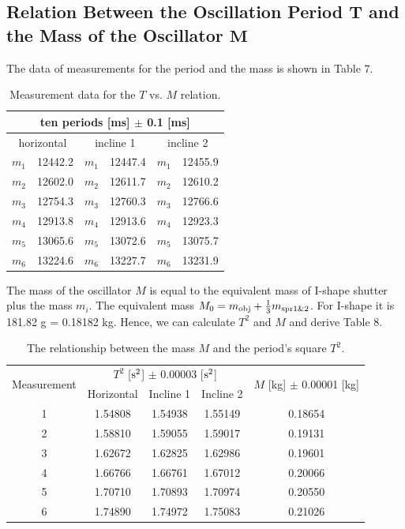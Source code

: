 \documentclass[a4paper]{report}
\begin{document}
	\subsection{Relation Between the Oscillation Period $\bm{T}$ and the Mass of the Oscillator $\bm{M}$}
	The data of measurements for the period and the mass is shown in Table 7.
	\begin{table}[H]
		\centering
		\begin{tabular}{|c|c||c|c||c|c|}
			\hline
			\multicolumn{6}{|c|}{ten periods [ms] $\pm$ 0.1 [ms]}\\
			\hline
			\multicolumn{2}{|c||}{horizontal}&\multicolumn{2}{|c||}{incline 1}&\multicolumn{2}{|c|}{incline 2}\\
			\hline
			$m_1$&12442.2&$m_1$&12447.4&$m_1$&12455.9\\
			\hline
			$m_2$&12602.0&$m_2$&12611.7&$m_2$&12610.2\\
			\hline
			$m_3$&12754.3&$m_3$&12760.3&$m_3$&12766.6\\
			\hline
			$m_4$&12913.8&$m_4$&12913.6&$m_4$&12923.3\\
			\hline
			$m_5$&13065.6&$m_5$&13072.6&$m_5$&13075.7\\
			\hline
			$m_6$&13224.6&$m_6$&13227.7&$m_6$&13231.9\\
			\hline
		\end{tabular}
	\caption{Measurement data for the $T$ vs. $M$ relation.}
	\end{table}
	The mass of the oscillator $M$ is equal to the equivalent mass of I-shape shutter plus the mass $m_i$. The equivalent mass $M_0=m_{\rm{obj}}+\frac{1}{3} m_{\rm{spr1\&2}}$. For I-shape it is 181.82 g = 0.18182 kg. Hence, we can calculate $T^2$ and $M$ and derive Table 8.
	\begin{table}[H]
		\centering
		\begin{tabular}{|c|c|c|c|c|}
			\hline
			\multirow{2}{*}{Measurement}&\multicolumn{3}{|c|}{$T^2$ [$\rm{s}^2$] $\pm$ 0.00003 [$\rm{s}^2$]}&\multirow{2}{*}{$M$ [kg] $\pm$ 0.00001 [kg]}\\
			\cline{2-4}
			&\multicolumn{1}{|c|}{Horizontal}&Incline 1&Incline 2&\\
			\hline
			1&1.54808&1.54938&1.55149&0.18654\\
			\hline
			2&1.58810&1.59055&1.59017&0.19131\\
			\hline
			3&1.62672&1.62825&1.62986&0.19601\\
			\hline
			4&1.66766&1.66761&1.67012&0.20066\\
			\hline
			5&1.70710&1.70893&1.70974&0.20550\\
			\hline
			6&1.74890&1.74972&1.75083&0.21026\\
			\hline
		\end{tabular}
	\caption{The relationship between the mass $M$ and the period's square $T^2$.}
	\end{table}
\end{document}
